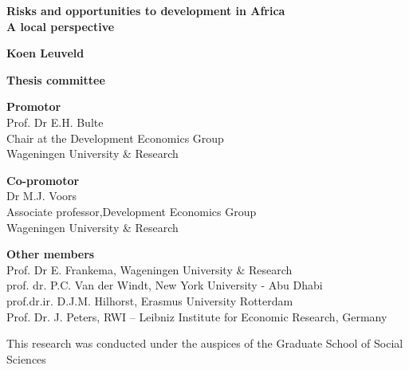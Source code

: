 \begin{titlepage}
   \begin{center}
          \vspace*{1cm}

          \Huge
          \textbf{Risks and opportunities to development in Africa \\ \LARGE A local perspective}


          \vfill
          \large     
          \textbf{Koen Leuveld}
               
          \vspace{0.8cm}
   \end{center}
\end{titlepage}


\begin{titlepage}
   \vspace*{1cm}
   \vspace*{\fill}

   \noindent
   \textbf{Thesis committee}\\
   \vspace*{0.5cm}
   
   \noindent
   \textbf{Promotor} \\
   Prof. Dr E.H. Bulte \\
   Chair at the Development Economics Group \\
   Wageningen University \& Research\\
   \vspace*{0.5cm}
   
   \noindent
   \textbf{Co-promotor} \\
   Dr M.J. Voors \\
   Associate professor,Development Economics Group \\
   Wageningen University \& Research\\
   \vspace*{0.5cm}
   
   \noindent
   \textbf{Other members} \\
   Prof. Dr E. Frankema, Wageningen University \& Research\\
   prof. dr. P.C. Van der Windt, New York University - Abu Dhabi\\
   prof.dr.ir. D.J.M. Hilhorst, Erasmus University Rotterdam\\
   Prof. Dr. J. Peters, RWI – Leibniz Institute for Economic Research, Germany\\
   \vspace*{0.5cm}
   
   \noindent
   This research was conducted under the auspices of the Graduate School of Social Sciences
   \vspace{0.8cm}
\end{titlepage}



